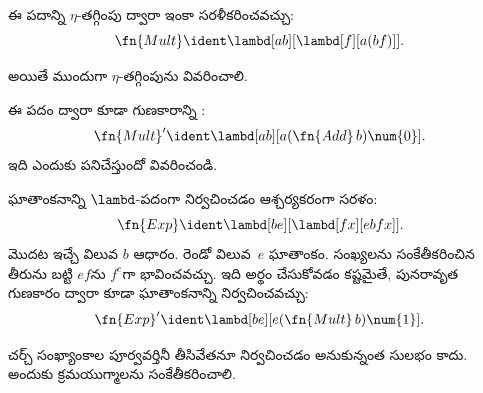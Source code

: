 \documentclass[../../../include/open-logic-section]{subfiles}
\begin{document}
\begin{editorial}
ఈ పదాన్ని $\eta$-తగ్గింపు ద్వారా ఇంకా సరళీకరించవచ్చు:
\[
  \fn{Mult} \ident \lambd[ab][\lambd[f][a (b f)]].
\]

అయితే ముందుగా $\eta$-తగ్గింపును వివరించాలి.
\end{editorial}

\begin{prob}
ఈ పదం ద్వారా కూడా గుణకారాన్ని
:
\[
  \fn{Mult}' \ident \lambd[ab][a (\fn{Add}\, b) \num{0}].
\]
ఇది ఎందుకు పనిచేస్తుందో వివరించండి.
\end{prob}

ఘాతాంకనాన్ని $\lambd$-పదంగా నిర్వచించడం ఆశ్చర్యకరంగా
సరళం:
\[
  \fn{Exp} \ident \lambd[be][\lambd[fx][e b f x]].
\]
మొదట ఇచ్చే విలువ $b$ ఆధారం. రెండో విలువ~$e$ ఘాతాంకం.
సంఖ్యలను సంకేతీకరించిన తీరును బట్టి $e f$ను
$f^e$గా భావించవచ్చు. ఇది అర్థం చేసుకోవడం కష్టమైతే,
పునరావృత గుణకారం ద్వారా కూడా ఘాతాంకనాన్ని
నిర్వచించవచ్చు:
\[
  \fn{Exp}' \ident \lambd[be][e (\fn{Mult}\, b) \num{1}].
\]

చర్చ్ సంఖ్యాంకాల పూర్వవర్తినీ తీసివేతనూ నిర్వచించడం
అనుకున్నంత సులభం కాదు. అందుకు క్రమయుగ్మాలను
సంకేతీకరించాలి.
\end{document}
